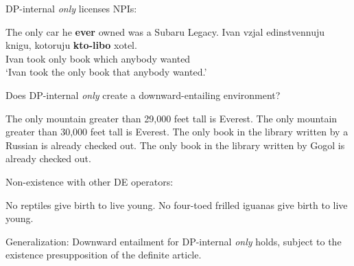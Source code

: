 \documentclass{article}
\begin{document}
\noindent DP-internal \textit{only} licenses NPIs:

\begin{exe}
	\ex The only car he \textbf{ever} owned was a Subaru Legacy.
	\ex \gll Ivan vzjal edinstvennuju knigu, kotoruju \textbf{kto-libo} xotel.\\
	Ivan took only book which anybody wanted\\
	\glt `Ivan took the only book that anybody wanted.'
\end{exe}

\noindent Does DP-internal \textit{only} create a downward-entailing environment?

\begin{exe}
	\ex The only mountain greater than 29,000 feet tall is Everest.
	\ex The only mountain greater than 30,000 feet tall is Everest.
	\ex The only book in the library written by a Russian is already checked out.
	\ex The only book in the library written by Gogol is already checked out.
\end{exe}

\noindent Non-existence with other DE operators:

\begin{exe}
	\ex No reptiles give birth to live young.
	\ex No four-toed frilled iguanas give birth to live young.
\end{exe}

\noindent Generalization: Downward entailment for DP-internal \textit{only} holds, subject to the existence presupposition of the definite article.


\end{document}
